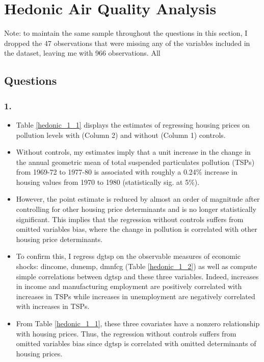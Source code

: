 \documentclass[12pt]{article}
\begin{document}
\clearpage

\section{Hedonic Air Quality Analysis}

Note: to maintain the same  sample throughout the questions in this section, I dropped the 47 observations that were missing any of the variables included in the dataset, leaving me with 966 observations. All 

\subsection{Questions}

\subsubsection*{1.}
\begin{itemize}
\item Table \ref{hedonic_1_1} displays the estimates of regressing housing prices on pollution levels with (Column 2) and without (Column 1) controls. 
\item Without controls, my estimates imply that a unit increase in the change in the annual geometric mean of total suspended particulates pollution (TSPs) from 1969-72 to 1977-80 is associated with roughly a 0.24\% increase in housing values from 1970 to 1980 (statistically sig. at 5\%). 
\item However, the point estimate is reduced by almost an order of magnitude after controlling for other housing price determinants and is no longer statistically significant. This implies that the regression without controls suffers from omitted variables bias, where the change in pollution is correlated with other housing price determinants. 
\item To confirm this, I regress dgtsp on the observable measures of economic shocks: dincome, dunemp, dmnfcg (Table \ref{hedonic_1_2}) as well as compute simple correlations between dgtsp and these three variables. Indeed, increases in income and manufacturing employment are positively correlated with increases in TSPs while increases in unemployment are negatively correlated with increases in TSPs. 
\item From Table \ref{hedonic_1_1}, these three covariates have a nonzero relationship with housing prices. Thus, the regression without controls suffers from omitted variables bias since dgtsp is correlated with omitted determinants of housing prices.
\end{itemize}
\end{document}
